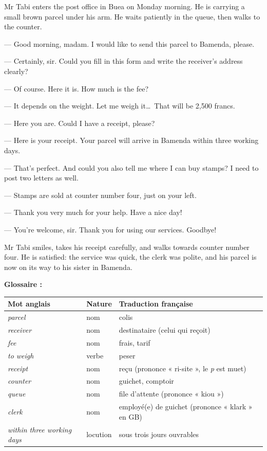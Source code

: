\documentclass[11pt]{article}
\newcommand{\eng}[1]{\ifmmode\text{\textit{#1}}\else\begingroup\selectlanguage{english}\itshape #1\endgroup\fi}
\begin{document}
\begin{textebox}
Mr Tabi enters the post office in Buea on Monday morning. He is carrying a small brown parcel under his arm. He waits patiently in the queue, then walks to the counter.

— Good morning, madam. I would like to send this parcel to Bamenda, please.

— Certainly, sir. Could you fill in this form and write the receiver's address clearly?

— Of course. Here it is. How much is the fee?

— It depends on the weight. Let me weigh it\ldots\ That will be 2,500 francs.

— Here you are. Could I have a receipt, please?

— Here is your receipt. Your parcel will arrive in Bamenda within three working days.

— That's perfect. And could you also tell me where I can buy stamps? I need to post two letters as well.

— Stamps are sold at counter number four, just on your left.

— Thank you very much for your help. Have a nice day!

— You're welcome, sir. Thank you for using our services. Goodbye!

Mr Tabi smiles, takes his receipt carefully, and walks towards counter number four. He is satisfied: the service was quick, the clerk was polite, and his parcel is now on its way to his sister in Bamenda.
\end{textebox}

\textbf{Glossaire :}

\begin{center}
\begin{tabularx}{\linewidth}{|l|l|X|}\hline
\rowcolor{popblueL} \textbf{Mot anglais} & \textbf{Nature} & \textbf{Traduction française} \\ \hline
\eng{parcel} & nom & colis \\ \hline
\eng{receiver} & nom & destinataire (celui qui reçoit) \\ \hline
\eng{fee} & nom & frais, tarif \\ \hline
\eng{to weigh} & verbe & peser \\ \hline
\eng{receipt} & nom & reçu (prononce « ri-site », le \emph{p} est muet) \\ \hline
\eng{counter} & nom & guichet, comptoir \\ \hline
\eng{queue} & nom & file d'attente (prononce « kiou ») \\ \hline
\eng{clerk} & nom & employé(e) de guichet (prononce « klark » en GB) \\ \hline
\eng{within three working days} & locution & sous trois jours ouvrables \\ \hline
\end{tabularx}
\end{center}
\end{document}
